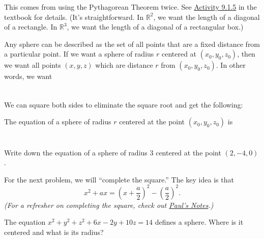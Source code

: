 This comes from using the Pythagorean Theorem twice. See \href{https://activecalculus.org/vector/S-9-1-Functions.html#A-9-1-4}{Activity 9.1.5} in the textbook for details. (It's straightforward. In $\mathbb{R}^2$, we want the length of a diagonal of a rectangle. In $\mathbb{R}^3$, we want the length of a diagonal of a rectangular box.)

Any sphere can be described as the set of all points that are a fixed distance from a particular point. If we want a sphere of radius $r$ centered at $(x_0,y_0,z_0)$, then we want all points $(x,y,z)$ which are distance $r$ from $(x_0,y_0,z_0)$. In other words, we want
\[
    \phantom{\sqrt{(x-x_0)^2+(y-y_0)^2+(z-z_0)^2}=r.}
\]
We can square both sides to eliminate the square root and get the following:
\begin{framed}
    The equation of a sphere of radius $r$ centered at the point $(x_0,y_0,z_0)$ is
    \[
        \phantom{(x-x_0)^2+(y-y_0)^2+(z-z_0)^2=r^2.}
    \]
\end{framed}
\begin{ex}
    Write down the equation of a sphere of radius 3 centered at the point $(2,-4,0)$.
\end{ex}

\vspace{1in}

For the next problem, we will ``complete the square.'' The key idea is that 
\[
    x^2+ax=\left(x+\dfrac{a}{2}\right)^2-\left(\dfrac{a}{2}\right)^2.\]
    \emph{(For a refresher on completing the square, check out \href{https://tutorial.math.lamar.edu/classes/alg/SolveQuadraticEqnsII.aspx}{Paul's Notes}.)}
\begin{ex}
    The equation $x^2+y^2+z^2+6x-2y+10z=14$ defines a sphere. Where is it centered and what is its radius?
\end{ex}
\vfill

